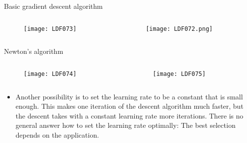 \begin{frame}{Basic gradient descent algorithm}
\begin{columns}
\begin{column}{7cm}
\vspace{-0.7cm}
\begin{figure}
\texttt{[image: LDF073]}
\end{figure}
\vspace{-0.5cm}
\end{column}
\begin{column}{7cm}
\vspace{-6pt}
\begin{figure}
\texttt{[image: LDF072.png]}
\end{figure}
\end{column}
\end{columns}
\end{frame}

\begin{frame}{Newton’s algorithm}
\begin{columns}
\begin{column}{7cm}
\begin{figure}
\texttt{[image: LDF074]}
\end{figure}
\end{column}
\begin{column}{7cm}
\begin{figure}
\texttt{[image: LDF075]}
\end{figure}
\end{column}
\end{columns}
\vspace{12pt}
\begin{itemize}
\item Another possibility is to set the learning rate to be a
constant that is small enough. This makes one iteration
of the descent algorithm much faster, but the descent
takes with a constant learning rate more iterations.
There is no general answer how to set the learning rate
optimally: The best selection depends on the
application.
\end{itemize}
\end{frame}


